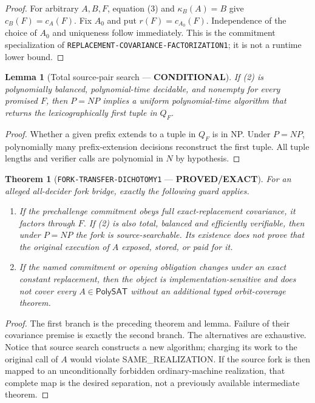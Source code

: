 \documentclass[11pt]{article}
\newcommand{\EXACT}{\textbf{PROVED/EXACT}}
\newcommand{\COND}{\textbf{CONDITIONAL}}
\newtheorem{theorem}{Theorem}
\newtheorem{lemma}{Lemma}
\begin{document}
\begin{proof}
For arbitrary $A,B,F$, equation (3) and $\kappa_B(A)=B$ give
$c_B(F)=c_A(F)$.  Fix $A_0$ and put $r(F)=c_{A_0}(F)$.  Independence of the
choice of $A_0$ and uniqueness follow immediately.  This is the commitment
specialization of \texttt{REPLACEMENT-COVARIANCE-FACTORIZATION1}; it is not a
runtime lower bound.
\end{proof}

\begin{lemma}[Total source-pair search --- \COND]
If (2) is polynomially balanced, polynomial-time decidable, and nonempty for
every promised $F$, then $P=NP$ implies a uniform polynomial-time algorithm
that returns the lexicographically first tuple in $Q_F$.
\end{lemma}

\begin{proof}
Whether a given prefix extends to a tuple in $Q_F$ is in NP.  Under $P=NP$,
polynomially many prefix-extension decisions reconstruct the first tuple.
All tuple lengths and verifier calls are polynomial in $N$ by hypothesis.
\end{proof}

\begin{theorem}[\texttt{FORK-TRANSFER-DICHOTOMY1} --- \EXACT]
For an alleged all-decider fork bridge, exactly the following guard applies.
\begin{enumerate}[leftmargin=1.7em]
\item If the prechallenge commitment obeys full exact-replacement covariance,
it factors through $F$.  If (2) is also total, balanced and efficiently
verifiable, then under $P=NP$ the fork is source-searchable.  Its existence
does not prove that the original execution of $A$ exposed, stored, or paid for
it.
\item If the named commitment or opening obligation changes under an exact
constant replacement, then the object is implementation-sensitive and does
not cover every $A\in\mathsf{PolySAT}$ without an additional typed
orbit-coverage theorem.
\end{enumerate}
\end{theorem}

\begin{proof}
The first branch is the preceding theorem and lemma.  Failure of their
covariance premise is exactly the second branch.  The alternatives are
exhaustive.  Notice that source search constructs a new algorithm; charging
its work to the original call of $A$ would violate SAME\_REALIZATION.  If the
source fork is then mapped to an unconditionally forbidden ordinary-machine
realization, that complete map is the desired separation, not a previously
available intermediate theorem.
\end{proof}
\end{document}
